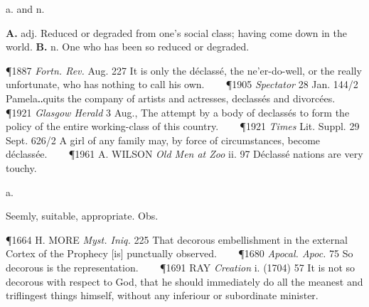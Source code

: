 \begin{description}[wide, labelwidth=!, labelindent=0pt]
 a. and n.

\noindent {}

\vspace{-0.3cm}

\textbf{A.} adj. Reduced or degraded from one's social class; having come down in the world. \textbf{B.} n. One who has been so reduced or degraded.

\P 1887 \textit{Fortn.  Rev.} Aug. 227 It is only the déclassé, the ne'er-do-well, or the really unfortunate, who has nothing to call his own.    
\P 1905  \textit{Spectator} 28 Jan. 144/2 Pamela‥quits the company of artists and actresses, declassés and divorcées.    
\P 1921 \textit{Glasgow  Herald} 3 Aug., The attempt by a body of declassés to form the policy of the entire working-class of this country.    
\P 1921  \textit{Times} Lit. Suppl. 29 Sept. 626/2 A girl of any family may, by force of circumstances, become déclassée.    
\P 1961 A. WILSON  \textit{Old Men at Zoo} ii. 97 Déclassé nations are very touchy.





 a.

\noindent {}

\vspace{-0.3cm}

\begin{myenumerate}

 Seemly, suitable, appropriate. Obs.

\P 1664 H. MORE  \textit{Myst. Iniq.} 225 That decorous embellishment in the external Cortex of the Prophecy [is] punctually observed.    
\P 1680 \textit{Apocal. Apoc.} 75 So decorous is the representation.    
\P 1691 RAY  \textit{Creation} i. (1704) 57 It is not so decorous with respect to God, that he should immediately do all the meanest and triflingest things himself, without any inferiour or subordinate minister.


\end{myenumerate}
\end{description}
